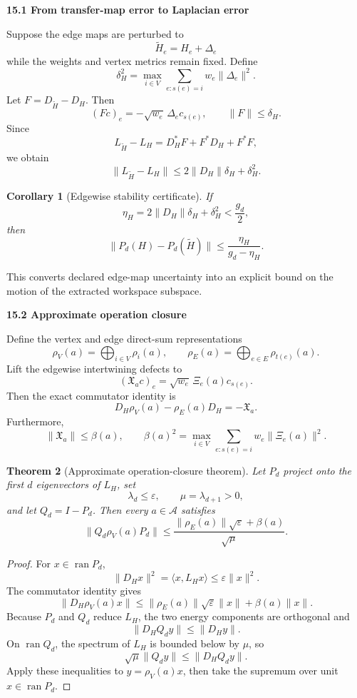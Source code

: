 \documentclass[11pt,letterpaper]{article}
\DeclareMathOperator{\ran}{ran}
\newcommand{\subtopic}[1]{%
 \vspace{0.45em}
 {\bfseries\color{AccentColor} #1\par}
}
\theoremstyle{plain}
\newtheorem{theorem}{Theorem}
\newtheorem{corollary}[theorem]{Corollary}
\theoremstyle{definition}
\begin{document}
\subtopic{15.1 From transfer-map error to Laplacian error}

Suppose the edge maps are perturbed to
\[
\widetilde H_e=H_e+\Delta_e
\]
while the weights and vertex metrics remain fixed. Define
\[
\boxed{
\delta_H^2
=
\max_{i\in V}
\sum_{e:s(e)=i}w_e\|\Delta_e\|^2.
}
\]
Let \(F=D_{\widetilde H}-D_H\). Then
\[
(Fc)_e=-\sqrt{w_e}\,\Delta_ec_{s(e)},
\qquad
\|F\|\leq\delta_H.
\]
Since
\[
L_{\widetilde H}-L_H
=D_H^*F+F^*D_H+F^*F,
\]
we obtain
\[
\boxed{
\|L_{\widetilde H}-L_H\|
\leq
2\|D_H\|\delta_H+\delta_H^2.
}
\]

\begin{corollary}[Edgewise stability certificate]\label{cor:edge-stability}
If
\[
\eta_H=2\|D_H\|\delta_H+\delta_H^2
<\frac{g_d}{2},
\]
then
\[
\boxed{
\|P_d(H)-P_d(\widetilde H)\|
\leq
\frac{\eta_H}{g_d-\eta_H}.
}
\]
\end{corollary}

This converts declared edge-map uncertainty into an explicit bound on the
motion of the extracted workspace subspace.

\subtopic{15.2 Approximate operation closure}

Define the vertex and edge direct-sum representations
\[
\rho_V(a)=\bigoplus_{i\in V}\rho_i(a),
\qquad
\rho_E(a)=\bigoplus_{e\in E}\rho_{t(e)}(a).
\]
Lift the edgewise intertwining defects to
\[
(\mathfrak X_a c)_e
=
\sqrt{w_e}\,\Xi_e(a)c_{s(e)}.
\]
Then the exact commutator identity is
\[
\boxed{
D_H\rho_V(a)-\rho_E(a)D_H=-\mathfrak X_a.
}
\]
Furthermore,
\[
\|\mathfrak X_a\|
\leq
\beta(a),
\qquad
\beta(a)^2
=
\max_{i\in V}
\sum_{e:s(e)=i}w_e\|\Xi_e(a)\|^2.
\]

\begin{theorem}[Approximate operation-closure theorem]\label{thm:approx-operation-closure}
Let \(P_d\) project onto the first \(d\) eigenvectors of \(L_H\), set
\[
\lambda_d\leq\varepsilon,
\qquad
\mu=\lambda_{d+1}>0,
\]
and let \(Q_d=I-P_d\). Then every \(a\in\mathcal A\) satisfies
\[
\boxed{
\|Q_d\rho_V(a)P_d\|
\leq
\frac{
\|\rho_E(a)\|\sqrt{\varepsilon}+\beta(a)
}{\sqrt{\mu}}.
}
\]
\end{theorem}

\begin{proof}
For \(x\in\ran P_d\),
\[
\|D_Hx\|^2
=\langle x,L_Hx\rangle
\leq\varepsilon\|x\|^2.
\]
The commutator identity gives
\[
\|D_H\rho_V(a)x\|
\leq
\|\rho_E(a)\|\sqrt{\varepsilon}\|x\|
+
\beta(a)\|x\|.
\]
Because \(P_d\) and \(Q_d\) reduce \(L_H\), the two energy components are
orthogonal and
\[
\|D_HQ_dy\|\leq\|D_Hy\|.
\]
On \(\ran Q_d\), the spectrum of \(L_H\) is bounded below by \(\mu\), so
\[
\sqrt{\mu}\|Q_dy\|
\leq
\|D_HQ_dy\|.
\]
Apply these inequalities to \(y=\rho_V(a)x\), then take the supremum over unit
\(x\in\ran P_d\).
\end{proof}
\end{document}
